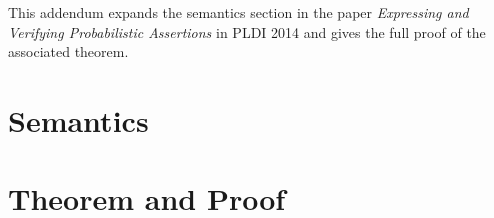 This addendum expands the semantics section in the paper \textit{Expressing
and Verifying Probabilistic Assertions} in PLDI 2014 and gives the
full proof of the associated theorem.

\section{Semantics}


\section{Theorem and Proof}

